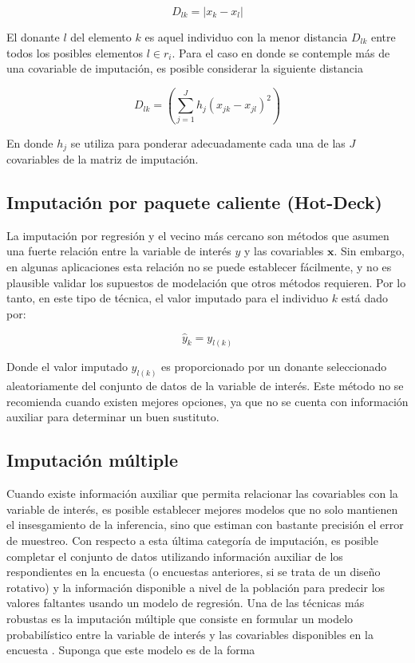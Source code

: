 \documentclass[
  12pt,
]{book}
\begin{document}
\[
D_{lk} = |x_k - x_l|
\]

El donante \(l\) del elemento \(k\) es aquel individuo con la menor distancia \(D_{lk}\) entre todos los posibles elementos \(l\in r_i\). Para el caso en donde se contemple más de una covariable de imputación, es posible considerar la siguiente distancia

\[
D_{lk} = \left( \sum_{j=1}^J h_j (x_{jk} - x_{jl})^2 \right)
\]

En donde \(h_j\) se utiliza para ponderar adecuadamente cada una de las \(J\) covariables de la matriz de imputación.

\hypertarget{imputaciuxf3n-por-paquete-caliente-hot-deck}{%
\subsection{Imputación por paquete caliente (Hot-Deck)}\label{imputaciuxf3n-por-paquete-caliente-hot-deck}}

La imputación por regresión y el vecino más cercano son métodos que asumen una fuerte relación entre la variable de interés \(y\) y las covariables \(\mathbf{x}\). Sin embargo, en algunas aplicaciones esta relación no se puede establecer fácilmente, y no es plausible validar los supuestos de modelación que otros métodos requieren. Por lo tanto, en este tipo de técnica, el valor imputado para el individuo \(k\) está dado por:

\[
\hat{y}_k = y_{l(k)}
\]

Donde el valor imputado \(y_{l(k)}\) es proporcionado por un donante seleccionado aleatoriamente del conjunto de datos de la variable de interés. Este método no se recomienda cuando existen mejores opciones, ya que no se cuenta con información auxiliar para determinar un buen sustituto.

\hypertarget{imputaciuxf3n-muxfaltiple}{%
\subsection{Imputación múltiple}\label{imputaciuxf3n-muxfaltiple}}

Cuando existe información auxiliar que permita relacionar las covariables con la variable de interés, es posible establecer mejores modelos que no solo mantienen el insesgamiento de la inferencia, sino que estiman con bastante precisión el error de muestreo. Con respecto a esta última categoría de imputación, es posible completar el conjunto de datos utilizando información auxiliar de los respondientes en la encuesta (o encuestas anteriores, si se trata de un diseño rotativo) y la información disponible a nivel de la población para predecir los valores faltantes usando un modelo de regresión. Una de las técnicas más robustas es la imputación múltiple que consiste en formular un modelo probabilístico entre la variable de interés y las covariables disponibles en la encuesta \citep{Rubin_1987}. Suponga que este modelo es de la forma
\end{document}
